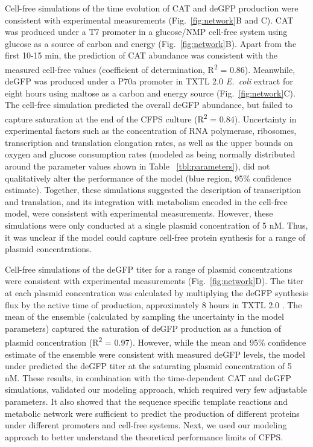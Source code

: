 \documentclass[journal=asbcd6,manuscript=article]{achemso}
\begin{document}
Cell-free simulations of the time evolution of CAT and deGFP production were consistent with experimental measurements (Fig.~\ref{fig:network}B and C).
CAT was produced under a T7 promoter in a glucose/NMP cell-free system \cite{2005_calhoun_BiotechnologyProgress} using glucose as a source of carbon and energy (Fig.~\ref{fig:network}B).
Apart from the first 10-15 min, the prediction of CAT abundance was consistent with the measured cell-free values (coefficient of determination, R\textsuperscript{2} = 0.86).
Meanwhile, deGFP was produced under a P70a promoter in TXTL 2.0 \textit{E.~coli} extract for eight hours using maltose as a carbon and energy source (Fig.~\ref{fig:network}C).
The cell-free simulation predicted the overall deGFP abundance, but failed to capture saturation at the end of the CFPS culture (R\textsuperscript{2} = 0.84).
Uncertainty in experimental factors such as the concentration of RNA polymerase, ribosomes, transcription and translation elongation rates, as well as the upper bounds on oxygen and glucose consumption rates (modeled as being normally distributed around the parameter values shown in Table ~\ref{tbl:parameters}), did not qualitatively alter the performance of the model (blue region, 95\% confidence estimate).
Together, these simulations suggested the description of transcription and translation, and its integration with metabolism encoded in the cell-free model, were consistent with experimental measurements.
However, these simulations were only conducted at a single plasmid concentration of 5 nM.
Thus, it was unclear if the model could capture cell-free protein synthesis for a range of plasmid concentrations.

Cell-free simulations of the deGFP titer for a range of plasmid concentrations were consistent with experimental measurements (Fig.~\ref{fig:network}D).
The titer at each plasmid concentration was calculated by multiplying the deGFP synthesis flux by the active time of production, approximately 8 hours in TXTL 2.0 \cite{Garamella:2016aa}.
The mean of the ensemble (calculated by sampling the uncertainty in the model parameters) captured the saturation of deGFP production as a function of plasmid concentration (R\textsuperscript{2} = 0.97).
However, while the mean and 95\% confidence estimate of the ensemble were consistent with measured deGFP levels, the model under predicted the deGFP titer at the saturating plasmid concentration of 5 nM.
These results, in combination with the time-dependent CAT and deGFP simulations, validated our modeling approach, which required very few adjustable parameters.
It also showed that the sequence specific template reactions and metabolic network were sufficient to predict the production of different proteins under different promoters and cell-free systems.
Next, we used our modeling approach to better understand the theoretical performance limits of CFPS.
\end{document}
